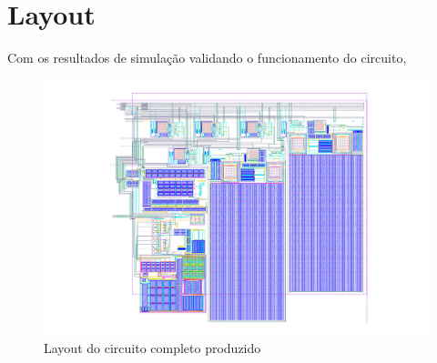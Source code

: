 \section{Layout}

Com os resultados de simulação validando o funcionamento do circuito, 

\begin{figure}[htb]
 \centering
    \centering
    \caption{Layout do circuito completo produzido} \label{\NomeSFig}
    \includegraphics[scale=0.5, angle=90]{Resultados/Imagens/Circuito Completo.jpeg}
\end{figure}
